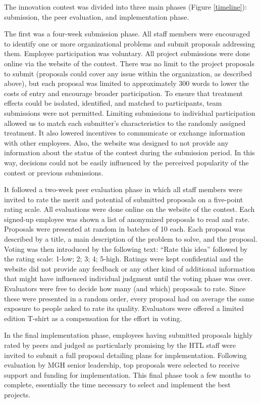 \documentclass[12pt, titlepage]{article}
\begin{document}
The innovation contest was divided into three main phases (Figure
\ref{timeline}): submission, the peer evaluation, and implementation
phase.

The first was a four-week submission phase. All staff members were
encouraged to identify one or more organizational problems and submit
proposals addressing them. Employee participation was voluntary. All
project submissions were done online via the website of the contest.
There was no limit to the project proposals to submit (proposals could
cover any issue within the organization, as described above), but each
proposal was limited to approximately 300 words to lower the costs of
entry and encourage broader participation. To ensure that treatment
effects could be isolated, identified, and matched to participants, team
submissions were not permitted. Limiting submissions to individual
participation allowed us to match each submitter's characteristics to
the randomly assigned treatment. It also lowered incentives to
communicate or exchange information with other employees. Also, the
website was designed to not provide any information about the status of
the contest during the submission period. In this way, decisions could
not be easily influenced by the perceived popularity of the contest or
previous submissions.

It followed a two-week peer evaluation phase in which all staff members
were invited to rate the merit and potential of submitted proposals on a
five-point rating scale. All evaluations were done online on the website
of the contest. Each signed-up employee was shown a list of anonymized
proposals to read and rate. Proposals were presented at random in
batches of 10 each. Each proposal was described by a title, a main
description of the problem to solve, and the proposal. Voting was then
introduced by the following text: ``Rate this idea'' followed by the
rating scale: 1-low; 2; 3; 4; 5-high. Ratings were kept confidential and
the website did not provide any feedback or any other kind of additional
information that might have influenced individual judgment until the
voting phase was over. Evaluators were free to decide how many (and
which) proposals to rate. Since these were presented in a random order,
every proposal had on average the same exposure to people asked to rate
its quality. Evaluators were offered a limited edition T-shirt as a
compensation for the effort in voting.

In the final implementation phase, employees having submitted proposals
highly rated by peers and judged as particularly promising by the HTL
staff were invited to submit a full proposal detailing plans for
implementation. Following evaluation by MGH senior leadership, top
proposals were selected to receive support and funding for
implementation. This final phase took a few months to complete,
essentially the time necessary to select and implement the best
projects.
\end{document}
